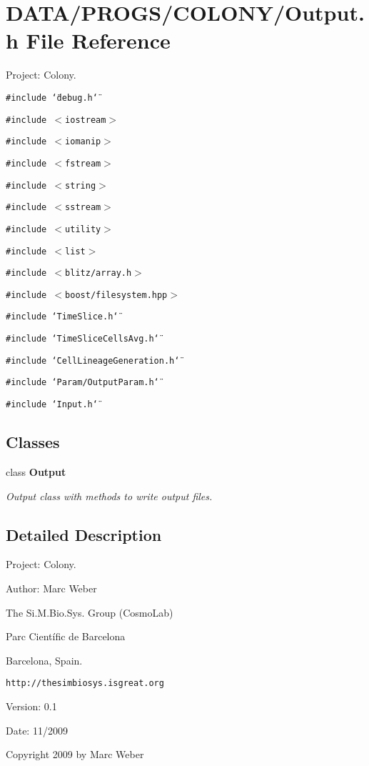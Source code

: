 \section{DATA/PROGS/COLONY/Output.h File Reference}
\label{Output_8h}
Project: Colony. 

{\tt \#include \char`\"{}debug.h\char`\"{}}\par
{\tt \#include $<$iostream$>$}\par
{\tt \#include $<$iomanip$>$}\par
{\tt \#include $<$fstream$>$}\par
{\tt \#include $<$string$>$}\par
{\tt \#include $<$sstream$>$}\par
{\tt \#include $<$utility$>$}\par
{\tt \#include $<$list$>$}\par
{\tt \#include $<$blitz/array.h$>$}\par
{\tt \#include $<$boost/filesystem.hpp$>$}\par
{\tt \#include \char`\"{}TimeSlice.h\char`\"{}}\par
{\tt \#include \char`\"{}TimeSliceCellsAvg.h\char`\"{}}\par
{\tt \#include \char`\"{}CellLineageGeneration.h\char`\"{}}\par
{\tt \#include \char`\"{}Param/OutputParam.h\char`\"{}}\par
{\tt \#include \char`\"{}Input.h\char`\"{}}\par
\subsection*{Classes}
\begin{CompactItemize}
\item 
class {\bf Output}
\begin{CompactList}\small\item\em Output class with methods to write output files. \item\end{CompactList}\end{CompactItemize}


\subsection{Detailed Description}
Project: Colony. 

\begin{Desc}
\item[Author:]Marc Weber\par
 The Si.M.Bio.Sys. Group (CosmoLab)\par
 Parc Científic de Barcelona\par
 Barcelona, Spain.\par
 {\tt http://thesimbiosys.isgreat.org} \end{Desc}
\begin{Desc}
\item[Version:]0.1 \end{Desc}
\begin{Desc}
\item[Date:]11/2009\end{Desc}
Copyright 2009 by Marc Weber 